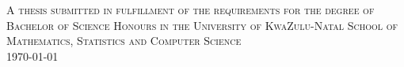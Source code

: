 \documentclass[12pt]{article}
\begin{document}
\begin{titlepage}
\begin{minipage}{0.4\textwidth}
\begin{flushright}
		\end{flushright}

	\end{minipage}
	



	
	
\vfill
\textsc{\small A thesis submitted in fulfillment of the requirements for the degree of Bachelor of Science Honours in the University of KwaZulu-Natal School of Mathematics, Statistics and Computer Science }\\
\vfill
	{\large\today} %
	
	 
	
	\vfill %
	
\end{titlepage}
\end{document}
